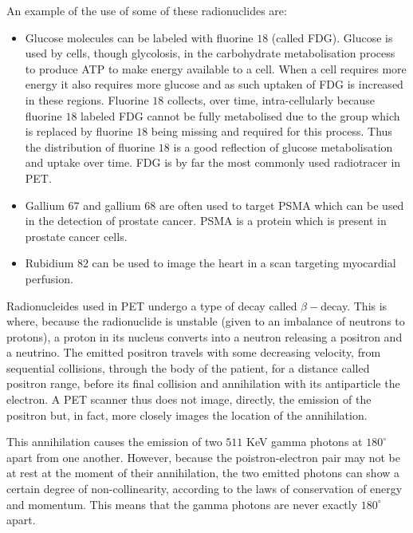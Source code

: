             An example of the use of some of these radionuclides are:
            
            \begin{itemize}
                \item Glucose molecules can be labeled with fluorine $18$ (called \gls{FDG}). Glucose is used by cells, though glycolosis, in the carbohydrate metabolisation process to produce \gls{ATP} to make energy available to a cell. When a cell requires more energy it also requires more glucose and as such uptaken of \gls{FDG} is increased in these regions. Fluorine $18$ collects, over time, intra-cellularly because fluorine $18$ labeled \gls{FDG} cannot be fully metabolised due to the group which is replaced by fluorine $18$ being missing and required for this process. Thus the distribution of fluorine $18$ is a good reflection of glucose metabolisation and uptake over time. \gls{FDG} is by far the most commonly used radiotracer in \gls{PET}.
                
                \item Gallium $67$ and gallium $68$ are often used to target \gls{PSMA} which can be used in the detection of prostate cancer. \gls{PSMA} is a protein which is present in prostate cancer cells.
                
                \item Rubidium $82$ can be used to image the heart in a scan targeting myocardial perfusion.
            \end{itemize}
            
            Radionucleides used in \gls{PET} undergo a type of decay called $\beta-$decay. This is where, because the radionuclide is unstable (given to an imbalance of neutrons to protons), a proton in its nucleus converts into a neutron releasing a positron and a neutrino. The emitted positron travels with some decreasing velocity, from sequential collisions, through the body of the patient, for a distance called positron range, before its final collision and annihilation with its antiparticle the electron. A \gls{PET} scanner thus does not image, directly, the emission of the positron but, in fact, more closely images the location of the annihilation.
            
            This annihilation causes the emission of two $511$ \gls{KeV} gamma photons at $180^{\circ}$ apart from one another. However, because the poistron-electron pair may not be at rest at the moment of their annihilation, the two emitted photons can show a certain degree of non-collinearity, according to the laws of conservation of energy and momentum. This means that the gamma photons are never exactly $180^{\circ}$ apart.%
            
